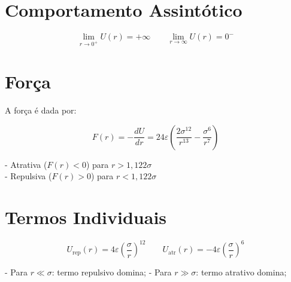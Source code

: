 \documentclass[12pt,a4paper]{article}
\begin{document}
\section{Comportamento Assintótico}

\[
\lim_{r \to 0^+} U(r) = +\infty
\qquad
\lim_{r \to \infty} U(r) = 0^-
\]


\section{Força}
\begin{flushleft}
A força é dada por:

\[
F(r) = -\frac{dU}{dr} = 24\varepsilon \left( \frac{2\sigma^{12}}{r^{13}} - \frac{\sigma^6}{r^7} \right)
\]

- Atrativa ($F(r)<0$) para $r > 1,122\sigma$\\  
- Repulsiva ($F(r)>0$) para $r < 1,122\sigma$\\  
\end{flushleft}

\section{Termos Individuais}

\[
U_{\text{rep}}(r) = 4\varepsilon \left( \frac{\sigma}{r} \right)^{12}
\qquad
U_{\text{atr}}(r) = -4\varepsilon \left( \frac{\sigma}{r} \right)^6
\]

- Para $r \ll \sigma$: termo repulsivo domina;  
- Para $r \gg \sigma$: termo atrativo domina;  
\end{document}
